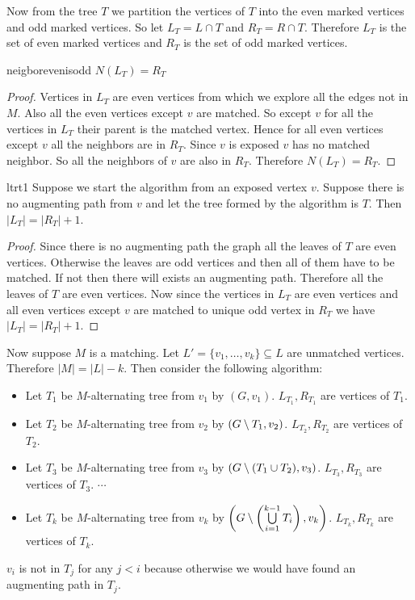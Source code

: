 Now from the tree $T$ we partition the vertices of $T$ into the even marked vertices and odd marked vertices. So let $L_T=L\cap T$ and $R_T=R\cap T$. Therefore $L_T$ is the set of even marked vertices and $R_T$ is the set of odd marked vertices.
\begin{lemma}{}{neigborevenisodd}
	$N(L_T)=R_T$
\end{lemma}
\begin{proof}
	Vertices in $L_T$ are even vertices from which we explore all the edges not in $M$. Also all the even vertices except $v$ are matched. So except $v$ for all the vertices in $L_T$ their parent is the matched vertex. Hence for all even vertices except $v$ all the neighbors are in $R_T$.  Since $v$ is exposed $v$ has no matched neighbor. So all the neighbors of $v$ are also in $R_T$. Therefore $N(L_T)=R_T$. 
\end{proof}
\begin{lemma}{}{ltrt1}
	Suppose we start the algorithm from an exposed vertex $v$. Suppose there is no augmenting path from $v$ and let the tree formed by the algorithm is $T$. Then $|L_T|=|R_T|+1$. 
\end{lemma}
\begin{proof}
	Since there is no augmenting path the graph all the leaves of $T$ are even vertices. Otherwise the leaves are odd vertices and then all of them have to be matched. If not then there will exists an augmenting path. Therefore all the leaves of $T$ are even vertices. Now since the vertices in $L_T$ are even vertices and all even vertices except $v$ are matched to unique odd vertex in $R_T$ we have $|L_T|=|R_T|+1$.
\end{proof}

Now suppose $M$ is a matching. Let $L'=\{v_1,\dots, v_k\}\subseteq L$ are unmatched vertices. Therefore $|M|=|L|-k$. Then consider the following algorithm:
\begin{itemize}
	\item Let $T_1$ be $M$-alternating tree from $v_1$ by  $(G,v_1)$. $L_{T_1}, R_{T_1}$ are vertices of $T_1$.
	\item Let $T_2$ be $M$-alternating tree from $v_2$ by  $\left(G\setminus T_1,v_2\right)$. $L_{T_2}, R_{T_2}$ are vertices of $T_2$.
	\item Let $T_3$ be $M$-alternating tree from $v_3$ by  $\left(G\setminus (T_1\cup T_2),v_3\right)$.  $L_{T_3}, R_{T_3}$ are vertices of $T_3$. $\cdots$
	\item Let $T_k$ be $M$-alternating tree from $v_k$ by  $\left(G\setminus \left(\bigcup\limits_{i=1}^{k-1}T_i\right),v_k\right)$.  $L_{T_k}, R_{T_k}$ are vertices of $T_k$.
\end{itemize}
\begin{observation}
	$v_i$ is not in $T_j$ for any $j<i$ because otherwise we would have found an augmenting path in $T_j$. 
\end{observation}

